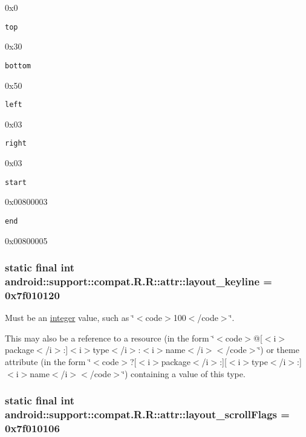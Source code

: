 0x0

{\tt top}

0x30

{\tt bottom}

0x50

{\tt left}

0x03

{\tt right}

0x03

{\tt start}

0x00800003

{\tt end}

0x00800005\hypertarget{classandroid_1_1support_1_1compat_1_1_r_1_1attr_3d6e09b626d4fc49d5b7b9c279f1c496}{
\subsubsection[{layout\_\-keyline}]{\setlength{\rightskip}{0pt plus 5cm}static final int android::support::compat.R.R::attr::layout\_\-keyline = 0x7f010120}}
\label{classandroid_1_1support_1_1compat_1_1_r_1_1attr_3d6e09b626d4fc49d5b7b9c279f1c496}


Must be an \hyperlink{classandroid_1_1support_1_1compat_1_1_r_1_1integer}{integer} value, such as \char`\"{}$<$code$>$100$<$/code$>$\char`\"{}. 

This may also be a reference to a resource (in the form \char`\"{}$<$code$>$@\mbox{[}$<$i$>$package$<$/i$>$:\mbox{]}$<$i$>$type$<$/i$>$:$<$i$>$name$<$/i$>$$<$/code$>$\char`\"{}) or theme attribute (in the form \char`\"{}$<$code$>$?\mbox{[}$<$i$>$package$<$/i$>$:\mbox{]}\mbox{[}$<$i$>$type$<$/i$>$:\mbox{]}$<$i$>$name$<$/i$>$$<$/code$>$\char`\"{}) containing a value of this type. \hypertarget{classandroid_1_1support_1_1compat_1_1_r_1_1attr_df9bc2c22d6154f280bac55d446a9932}{
\subsubsection[{layout\_\-scrollFlags}]{\setlength{\rightskip}{0pt plus 5cm}static final int android::support::compat.R.R::attr::layout\_\-scrollFlags = 0x7f010106}}
\label{classandroid_1_1support_1_1compat_1_1_r_1_1attr_df9bc2c22d6154f280bac55d446a9932}


